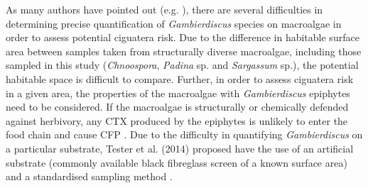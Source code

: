 \documentclass[12pt]{article}
\begin{document}

As many authors have pointed out (e.g. \citep{litaker2010global,bomber1989epiphytism,tester2014sampling,cruz2006macroalgal,parsons2011examination,globalcig,lobel1988assessment}), there are several difficulties in determining precise quantification of \textit{Gambierdiscus} species on macroalgae in order to assess potential ciguatera risk. 
Due to the difference in habitable surface area between samples taken from structurally diverse macroalgae, including those sampled in this study (\emph{Chnoospora}, \emph{Padina} sp. and \emph{Sargassum} sp.), the potential habitable space is difficult to compare. 
Further, in order to assess ciguatera risk in a given area, the properties of the macroalgae with \emph{Gambierdiscus} epiphytes need to be considered. 
If the macroalgae is structurally or chemically defended against herbivory, any CTX produced by the epiphytes is unlikely to enter the food chain and cause CFP \citep{cruz2006macroalgal}. 
Due to the difficulty in quantifying \emph{Gambierdiscus} on a particular substrate, Tester et al. (2014) proposed have the use of an artificial substrate (commonly available black fibreglass screen of a known surface area) and a standardised sampling method \citep{tester2014sampling}.
\end{document}
